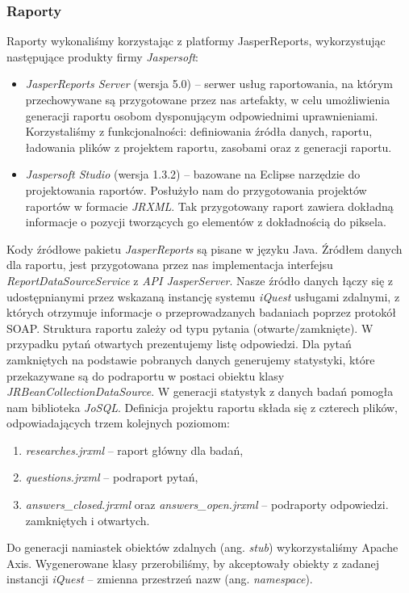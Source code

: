 \subsubsection{Raporty}
Raporty wykonaliśmy korzystając z platformy JasperReports, wykorzystując następujące produkty firmy \emph{Jaspersoft}:

\begin{itemize}
\item \emph{JasperReports Server} (wersja 5.0) -- serwer usług raportowania, na którym przechowywane są przygotowane przez nas artefakty, w celu umożliwienia generacji raportu osobom dysponującym odpowiednimi uprawnieniami. Korzystaliśmy z funkcjonalności: definiowania źródła danych, raportu, ładowania plików z projektem raportu, zasobami oraz z generacji raportu.
\item \emph{Jaspersoft Studio} (wersja 1.3.2) -- bazowane na Eclipse narzędzie do projektowania raportów. Posłużyło nam do przygotowania projektów raportów w formacie \emph{JRXML}. Tak przygotowany raport zawiera dokładną informacje o pozycji tworzących go elementów z dokładnością do piksela.
\end{itemize}

Kody źródłowe pakietu \emph{JasperReports} są pisane w języku Java. Źródłem danych dla raportu, jest przygotowana przez nas implementacja interfejsu \emph{ReportDataSourceService} z \emph{API JasperServer}. Nasze źródło danych łączy się z udostępnianymi przez wskazaną instancję systemu \emph{iQuest} usługami zdalnymi, z których otrzymuje informacje o przeprowadzanych badaniach poprzez protokół SOAP. Struktura raportu zależy od typu pytania (otwarte/zamknięte). W przypadku pytań otwartych prezentujemy listę odpowiedzi. Dla pytań zamkniętych na podstawie pobranych danych generujemy statystyki, które przekazywane są do podraportu w postaci obiektu klasy \emph{JRBeanCollectionDataSource}. W generacji statystyk z danych badań pomogła nam biblioteka \emph{JoSQL}. Definicja projektu raportu składa się z czterech plików, odpowiadających trzem kolejnych poziomom:
\begin{enumerate}
\item \emph{researches.jrxml} -- raport główny dla badań,
\item \emph{questions.jrxml} -- podraport pytań,
\item \emph{answers\_closed.jrxml} oraz \emph{answers\_open.jrxml} -- podraporty odpowiedzi. zamkniętych i otwartych.
\end{enumerate}
Do generacji namiastek obiektów zdalnych (ang. \emph{stub}) wykorzystaliśmy Apache Axis. Wygenerowane klasy przerobiliśmy, by akceptowały obiekty z zadanej instancji \emph{iQuest} -- zmienna przestrzeń nazw (ang. \emph{namespace}).\\

